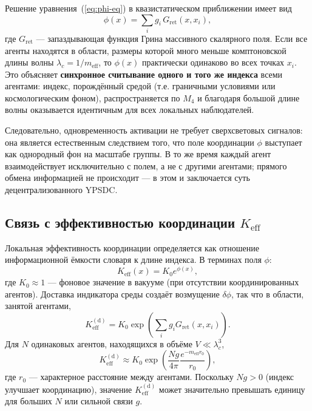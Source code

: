 \documentclass[11pt,a4paper]{article}
\newcommand{\Keff}{K_{\mathrm{eff}}}
\begin{document}
	Решение уравнения~(\ref{eq:phi-eq}) в квазистатическом приближении имеет вид
	\begin{equation}
		\phi(x) = \sum_i g_i \, G_{\mathrm{ret}}(x, x_i),
	\end{equation}
	где \(G_{\mathrm{ret}}\) — запаздывающая функция Грина массивного скалярного поля. Если все агенты находятся в области, размеры которой много меньше комптоновской длины волны \(\lambda_c = 1/m_{\mathrm{eff}}\), то \(\phi(x)\) практически одинаково во всех точках \(x_i\). Это объясняет \textbf{синхронное считывание одного и того же индекса} всеми агентами: индекс, порождённый средой (т.е. граничными условиями или космологическим фоном), распространяется по \(M_4\) и благодаря большой длине волны оказывается идентичным для всех локальных наблюдателей.
	
	Следовательно, одновременность активации не требует сверхсветовых сигналов: она является естественным следствием того, что поле координации \(\phi\) выступает как однородный фон на масштабе группы. В то же время каждый агент взаимодействует исключительно с полем, а не с другими агентами; прямого обмена информацией не происходит — в этом и заключается суть децентрализованного YPSDC.
	
	\subsection{Связь с эффективностью координации \(K_{\mathrm{eff}}\)}
	
	Локальная эффективность координации определяется как отношение информационной ёмкости словаря к длине индекса. В терминах поля \(\phi\):
	\begin{equation}
		\Keff(x) = K_0 e^{\phi(x)},
		\label{eq:Keff-field}
	\end{equation}
	где \(K_0 \approx 1\) — фоновое значение в вакууме (при отсутствии координированных агентов). Доставка индикатора среды создаёт возмущение \(\delta\phi\), так что в области, занятой агентами,
	\begin{equation}
		\Keff^{\mathrm{(d)}} = K_0 \exp\!\left( \sum_i g_i G_{\mathrm{ret}}(x, x_i) \right).
	\end{equation}
	Для \(N\) одинаковых агентов, находящихся в объёме \(V \ll \lambda_c^3\),
	\begin{equation}
		\Keff^{\mathrm{(d)}} \approx K_0 \exp\!\left( \frac{N g}{4\pi} \frac{e^{-m_{\mathrm{eff}} r_0}}{r_0} \right),
	\end{equation}
	где \(r_0\) — характерное расстояние между агентами. Поскольку \(N g > 0\) (индекс улучшает координацию), значение \(\Keff^{\mathrm{(d)}}\) может значительно превышать единицу для больших \(N\) или сильной связи \(g\).
	
\end{document}
